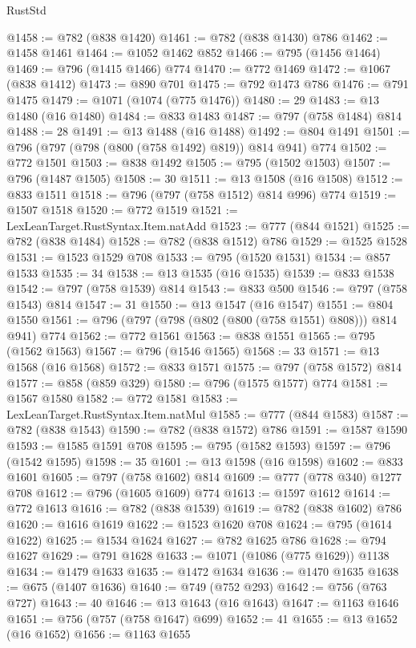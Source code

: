 \begin{lexlean}{RustStd}
\begin{coremodule}
{\begin{coremodule}
{{{{{{{{{{{{{{@1458 := @782 (@838 @1420)
@1461 := @782 (@838 @1430) @786
@1462 := @1458 @1461
@1464 := @1052 @1462 @852
@1466 := @795 (@1456 @1464)
@1469 := @796 (@1415 @1466) @774
@1470 := @772 @1469
@1472 := @1067 (@838 @1412)
@1473 := @890 @701
@1475 := @792 @1473 @786
@1476 := @791 @1475
@1479 := @1071 (@1074 (@775 @1476))
@1480 := 29
@1483 := @13 @1480 (@16 @1480)
@1484 := @833 @1483
@1487 := @797 (@758 @1484) @814
@1488 := 28
@1491 := @13 @1488 (@16 @1488)
@1492 := @804 @1491
@1501 := @796 (@797 (@798 (@800 (@758 @1492) @819)) @814 @941) @774
@1502 := @772 @1501
@1503 := @838 @1492
@1505 := @795 (@1502 @1503)
@1507 := @796 (@1487 @1505)
@1508 := 30
@1511 := @13 @1508 (@16 @1508)
@1512 := @833 @1511
@1518 := @796 (@797 (@758 @1512) @814 @996) @774
@1519 := @1507 @1518
@1520 := @772 @1519
@1521 := LexLeanTarget.RustSyntax.Item.natAdd
@1523 := @777 (@844 @1521)
@1525 := @782 (@838 @1484)
@1528 := @782 (@838 @1512) @786
@1529 := @1525 @1528
@1531 := @1523 @1529 @708
@1533 := @795 (@1520 @1531)
@1534 := @857 @1533
@1535 := 34
@1538 := @13 @1535 (@16 @1535)
@1539 := @833 @1538
@1542 := @797 (@758 @1539) @814
@1543 := @833 @500
@1546 := @797 (@758 @1543) @814
@1547 := 31
@1550 := @13 @1547 (@16 @1547)
@1551 := @804 @1550
@1561 := @796 (@797 (@798 (@802 (@800 (@758 @1551) @808))) @814 @941) @774
@1562 := @772 @1561
@1563 := @838 @1551
@1565 := @795 (@1562 @1563)
@1567 := @796 (@1546 @1565)
@1568 := 33
@1571 := @13 @1568 (@16 @1568)
@1572 := @833 @1571
@1575 := @797 (@758 @1572) @814
@1577 := @858 (@859 @329)
@1580 := @796 (@1575 @1577) @774
@1581 := @1567 @1580
@1582 := @772 @1581
@1583 := LexLeanTarget.RustSyntax.Item.natMul
@1585 := @777 (@844 @1583)
@1587 := @782 (@838 @1543)
@1590 := @782 (@838 @1572) @786
@1591 := @1587 @1590
@1593 := @1585 @1591 @708
@1595 := @795 (@1582 @1593)
@1597 := @796 (@1542 @1595)
@1598 := 35
@1601 := @13 @1598 (@16 @1598)
@1602 := @833 @1601
@1605 := @797 (@758 @1602) @814
@1609 := @777 (@778 @340) @1277 @708
@1612 := @796 (@1605 @1609) @774
@1613 := @1597 @1612
@1614 := @772 @1613
@1616 := @782 (@838 @1539)
@1619 := @782 (@838 @1602) @786
@1620 := @1616 @1619
@1622 := @1523 @1620 @708
@1624 := @795 (@1614 @1622)
@1625 := @1534 @1624
@1627 := @782 @1625 @786
@1628 := @794 @1627
@1629 := @791 @1628
@1633 := @1071 (@1086 (@775 @1629)) @1138
@1634 := @1479 @1633
@1635 := @1472 @1634
@1636 := @1470 @1635
@1638 := @675 (@1407 @1636)
@1640 := @749 (@752 @293)
@1642 := @756 (@763 @727)
@1643 := 40
@1646 := @13 @1643 (@16 @1643)
@1647 := @1163 @1646
@1651 := @756 (@757 (@758 @1647) @699)
@1652 := 41
@1655 := @13 @1652 (@16 @1652)
@1656 := @1163 @1655
}}}}}}}}}}}}}}
\end{coremodule}}
\end{coremodule}
\end{lexlean}
